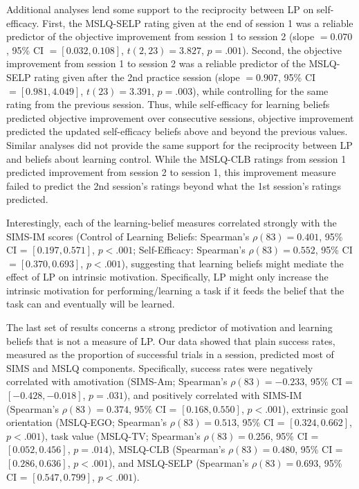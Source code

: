 Additional analyses lend some support to the reciprocity between \ac{LP} on self-efficacy. First, the \ac{MSLQ}-SELP rating given at the end of session 1 was a reliable predictor of the objective improvement from session 1 to session 2 (slope $= 0.070$, 95\% CI $=[0.032, 0.108]$, $t(2, 23) = 3.827$, $p = .001$). Second, the objective improvement from session 1 to session 2 was a reliable predictor of the \ac{MSLQ}-SELP rating given after the 2nd practice session (slope $= 0.907$, 95\% CI $=[0.981, 4.049]$, $t(23) = 3.391$, $p = .003$), while controlling for the same rating from the previous session. Thus, while self-efficacy for learning beliefs predicted objective improvement over consecutive sessions, objective improvement predicted the updated self-efficacy beliefs above and beyond the previous values. Similar analyses did not provide the same support for the reciprocity between \ac{LP} and beliefs about learning control. While the \ac{MSLQ}-CLB ratings from session 1 predicted improvement from session 2 to session 1, this improvement measure failed to predict the 2nd session's ratings beyond what the 1st session's ratings predicted.

Interestingly, each of the learning-belief measures correlated strongly with the \ac{SIMS}-IM scores (Control of Learning Beliefs: Spearman's $\rho(83) = 0.401$, 95\% CI = $[0.197, 0.571]$, $p < .001$; Self-Efficacy: Spearman's $\rho(83) = 0.552$, 95\% CI $= [0.370, 0.693]$, $p < .001$), suggesting that learning beliefs might mediate the effect of \ac{LP} on intrinsic motivation. Specifically, \ac{LP} might only increase the intrinsic motivation for performing/learning a task if it feeds the belief that the task can and eventually will be learned.

The last set of results concerns a strong predictor of motivation and learning beliefs that is not a measure of \ac{LP}. Our data showed that plain success rates, measured as the proportion of successful trials in a session, predicted most of \ac{SIMS} and \ac{MSLQ} components. Specifically, success rates were negatively correlated with amotivation (\ac{SIMS}-Am; Spearman's $\rho(83) = -0.233$, 95\% CI = $[-0.428, -0.018]$, $p = .031$), and positively correlated with \ac{SIMS}-IM (Spearman's $\rho(83) = 0.374$, 95\% CI = $[0.168, 0.550]$, $p < .001$), extrinsic goal orientation (\ac{MSLQ}-EGO; Spearman's $\rho(83) = 0.513$, 95\% CI = $[0.324, 0.662]$, $p < .001$), task value (\ac{MSLQ}-TV; Spearman's $\rho(83) = 0.256$, 95\% CI = $[0.052, 0.456]$, $p = .014$), \ac{MSLQ}-CLB (Spearman's $\rho(83) = 0.480$, 95\% CI = $[0.286, 0.636]$, $p < .001$), and \ac{MSLQ}-SELP (Spearman's $\rho(83) = 0.693$, 95\% CI = $[0.547, 0.799]$, $p < .001$).

